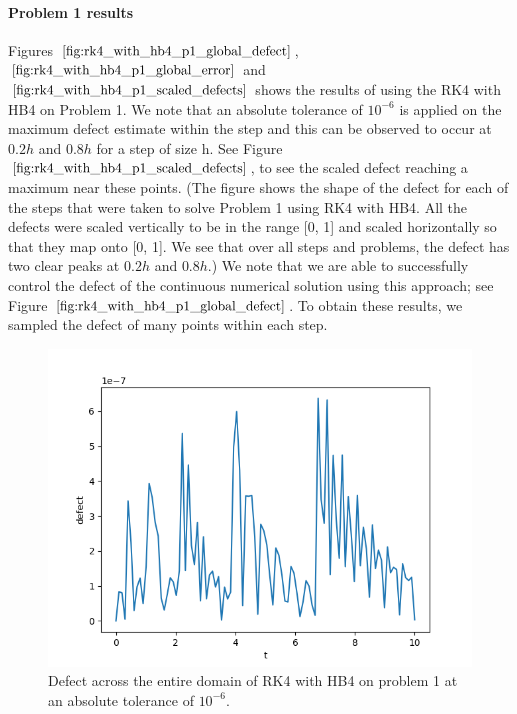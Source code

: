 \documentclass{article}
\begin{document}
\paragraph{Problem 1 results}
Figures $\ref{fig:rk4_with_hb4_p1_global_defect}$, $\ref{fig:rk4_with_hb4_p1_global_error}$ and $\ref{fig:rk4_with_hb4_p1_scaled_defects}$ shows the results of using the RK4 with HB4 on Problem 1. We note that an absolute tolerance of $10^{-6}$ is applied on the maximum defect estimate within the step and this can be observed to occur at $0.2h$ and $0.8h$ for a step of size h. See Figure $\ref{fig:rk4_with_hb4_p1_scaled_defects}$, to see the scaled defect reaching a maximum near these points. (The figure shows the shape of the defect for each of the steps that were taken to solve Problem 1 using RK4 with HB4. All the defects were scaled vertically to be in the range [0, 1] and scaled horizontally so that they map onto [0, 1]. We see that over all steps and problems, the defect has two clear peaks at $0.2h$ and $0.8h$.) We note that we are able to successfully control the defect of the continuous numerical solution using this approach; see Figure $\ref{fig:rk4_with_hb4_p1_global_defect}$. To obtain these results, we sampled the defect of many points within each step.

\begin{figure}[H]
\centering
\includegraphics[width=0.7\linewidth]{./figures/rk4_with_hb4_p1_global_defect}
\caption{Defect across the entire domain of RK4 with HB4 on problem 1 at an absolute tolerance of $10^{-6}$.}
\label{fig:rk4_with_hb4_p1_global_defect}
\end{figure}
\end{document}
